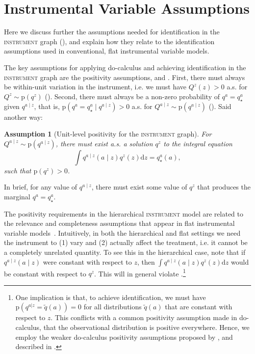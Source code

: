 \documentclass[12pt]{article}
\newtheorem{assumption}{Assumption}
\newcommand{\di}{\mathrm{d}}
\newcommand{\pr}{\mathrm{p}}
\begin{document}
 \section{Instrumental Variable Assumptions} \label{sec:completeness}

 Here we discuss further the assumptions needed for identification in the \textsc{instrument} graph (), and explain how they relate to the identification assumptions used in conventional, flat instrumental variable models.
 
 The key assumptions for applying do-calculus and achieving identification in the \textsc{instrument} graph are the positivity assumptions,  and .
 First, there must always be within-unit variation in the instrument, i.e. we must have $Q^z(z) > 0$ a.s. for $Q^z \sim \pr(q^z)$ (). 
 Second, there must always be a non-zero probability of $q^a = q^a_\star$ given $q^{a \mid z}$, that is, $\pr(q^a = q^a_\star \mid q^{a \mid z}) > 0$ a.s. for $Q^{a \mid z} \sim \pr(q^{a \mid z})$ ().
Said another way:
\begin{assumption}[Unit-level positivity for the \textsc{instrument} graph]\label{asm:instrument_positive} 
For $Q^{a \mid z} \sim \pr(q^{a \mid z})$, there must exist a.s. a solution $q^z$ to the integral equation
\begin{equation} \label{eqn:iv_integral_eqn}
        \int q^{a \mid z} (a \mid z) q^{z} (z) \di z = q_\star^a(a),
 \end{equation}
 such that $\pr(q^z) > 0$. 
 \end{assumption}
\noindent In brief, for any value of $q^{a \mid z}$, there must exist some value of $q^z$ that produces the marginal $q^a = q^a_\star$.


The positivity requirements in the hierarchical \textsc{instrument} model are related to the relevance and completeness assumptions that appear in flat instrumental variable models~\citep{Newey2003-dl}.
Intuitively, in both the hierarchical and flat settings we need the instrument to (1) vary and (2) actually affect the treatment, i.e. it cannot be a completely unrelated quantity.
To see this in the hierarchical case, note that if $q^{a \mid z}(a \mid z)$ were constant with respect to $z$, then $\int q^{a \mid z} (a \mid z) q^{z} (z) \di z$ would be constant with respect to $q^{z}$.
This will in general violate .\footnote{One implication is that, to achieve identification, we must have $\pr(q^{a|z}=\tilde{q}(a)) = 0$ for all distributions $\tilde{q}(a)$ that are constant with respect to $z$. This conflicts with a common positivity assumption made in do-calculus, that the observational distribution is positive everywhere. Hence, we employ the weaker do-calculus positivity assumptions proposed by \citet{Shpitser2006-jg}, and described in .}
\end{document}

